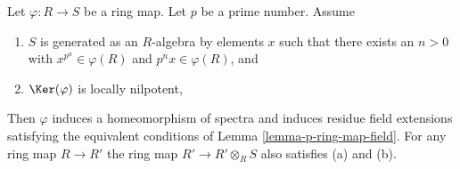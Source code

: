 \begin{lemma}
\label{lemma-p-ring-map}
Let $\varphi : R \to S$ be a ring map. Let $p$ be a prime number. Assume
\begin{enumerate}
\item[(a)] $S$ is generated as an $R$-algebra by elements $x$ such
that there exists an $n > 0$ with $x^{p^n} \in \varphi(R)$ and
$p^nx \in \varphi(R)$, and
\item[(b)] $\Ker(\varphi)$ is locally nilpotent,
\end{enumerate}
Then $\varphi$ induces a homeomorphism of spectra and induces
residue field extensions satisfying the equivalent conditions
of Lemma \ref{lemma-p-ring-map-field}. For any ring map $R \to R'$
the ring map $R' \to R' \otimes_R S$ also satisfies (a) and (b).
\end{lemma}

